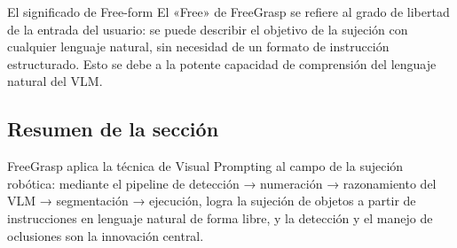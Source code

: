 \begin{importantbox}{El significado de Free-form}
El «Free» de FreeGrasp se refiere al grado de libertad de la entrada del usuario: se puede describir el objetivo de la sujeción con cualquier lenguaje natural, sin necesidad de un formato de instrucción estructurado. Esto se debe a la potente capacidad de comprensión del lenguaje natural del VLM.
\end{importantbox}

\subsection{Resumen de la sección}

FreeGrasp aplica la técnica de Visual Prompting al campo de la sujeción robótica: mediante el pipeline de detección → numeración → razonamiento del VLM → segmentación → ejecución, logra la sujeción de objetos a partir de instrucciones en lenguaje natural de forma libre, y la detección y el manejo de oclusiones son la innovación central.

